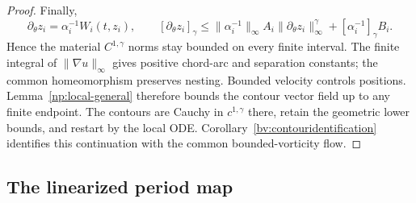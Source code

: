 \documentclass[11pt]{amsart}
\theoremstyle{remark}
\numberwithin{equation}{section}
\begin{document}
\begin{proof}
Finally,
\[
 \partial_\theta z_i=\alpha_i^{-1}W_i(t,z_i),\qquad
 [\partial_\theta z_i]_\gamma
 \le\|\alpha_i^{-1}\|_\infty A_i\|\partial_\theta z_i\|_\infty^\gamma
       +[\alpha_i^{-1}]_\gamma B_i.
\]
Hence the material $C^{1,\gamma}$ norms stay bounded on every
finite interval. The finite integral of $\|\nabla u\|_\infty$
gives positive chord-arc and separation constants; the common
homeomorphism preserves nesting. Bounded velocity controls
positions. Lemma~\ref{np:local-general} therefore bounds the
contour vector field up to any finite endpoint. The contours are
Cauchy in $c^{1,\gamma}$ there, retain the geometric lower bounds,
and restart by the local ODE. Corollary~\ref{bv:contouridentification}
identifies this continuation with the common bounded-vorticity flow.
\end{proof}

\subsection{The linearized period map}
\end{document}
